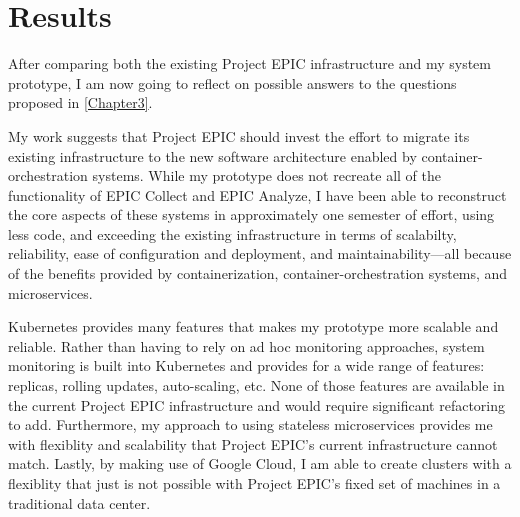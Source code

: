 
\chapter{Results} %

\label{Chapter7} %


After comparing both the existing Project EPIC infrastructure and my system prototype, I am now going to reflect on possible answers to the questions proposed in \autoref{Chapter3}.

My work suggests that Project EPIC should invest the effort to migrate its existing infrastructure to the new software architecture enabled by container-orchestration systems. While my prototype does not recreate all of the functionality of EPIC Collect and EPIC Analyze, I have been able to reconstruct the core aspects of these systems in approximately one semester of effort, using less code, and exceeding the existing infrastructure in terms of scalabilty, reliability, ease of configuration and deployment, and maintainability---all because of the benefits provided by containerization, container-orchestration systems, and microservices.

Kubernetes provides many features that makes my prototype more scalable and reliable. Rather than having to rely on ad hoc monitoring approaches, system monitoring is built into Kubernetes and provides for a wide range of features: replicas, rolling updates, auto-scaling, etc. None of those features are available in the current Project EPIC infrastructure and would require significant refactoring to add. Furthermore, my approach to using stateless microservices provides me with flexiblity and scalability that Project EPIC's current infrastructure cannot match. Lastly, by making use of Google Cloud, I am able to create clusters with a flexiblity that just is not possible with Project EPIC's fixed set of machines in a traditional data center.

